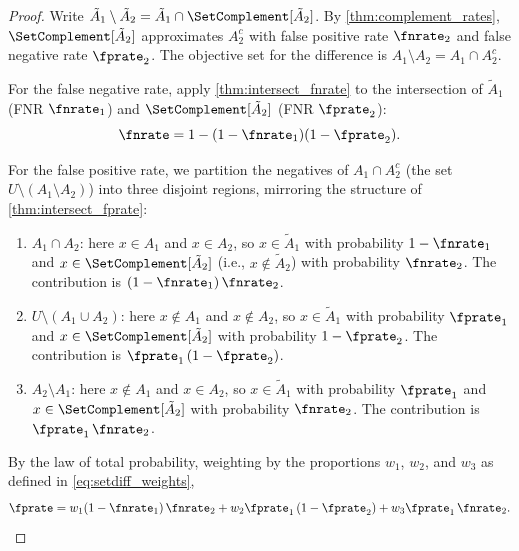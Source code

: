 \begin{proof}
Write $\tilde{A}_1 \setminus \tilde{A}_2
= \tilde{A}_1 \cap \SetComplement[\tilde{A}_2]$.
By \cref{thm:complement_rates}, $\SetComplement[\tilde{A}_2]$ approximates
$A_2^c$ with false positive rate $\fnrate_2$ and false negative rate
$\fprate_2$.
The objective set for the difference is
$A_1 \setminus A_2 = A_1 \cap A_2^c$.

For the false negative rate, apply \cref{thm:intersect_fnrate} to the
intersection of $\tilde{A}_1$ (FNR $\fnrate_1$) and
$\SetComplement[\tilde{A}_2]$ (FNR $\fprate_2$):
\begin{equation}
\fnrate = 1 - (1 - \fnrate_1)(1 - \fprate_2).
\end{equation}

For the false positive rate, we partition the negatives of
$A_1 \cap A_2^c$ (the set $U \setminus (A_1 \setminus A_2)$) into three
disjoint regions, mirroring the structure of \cref{thm:intersect_fprate}:
\begin{enumerate}[label=(\roman*)]
    \item $A_1 \cap A_2$: here $x \in A_1$ and $x \in A_2$, so
        $x \in \tilde{A}_1$ with probability $1 - \fnrate_1$ and
        $x \in \SetComplement[\tilde{A}_2]$ (i.e., $x \notin \tilde{A}_2$)
        with probability $\fnrate_2$.
        The contribution is $(1 - \fnrate_1)\,\fnrate_2$.

    \item $U \setminus (A_1 \cup A_2)$: here $x \notin A_1$ and
        $x \notin A_2$, so
        $x \in \tilde{A}_1$ with probability $\fprate_1$ and
        $x \in \SetComplement[\tilde{A}_2]$ with probability
        $1 - \fprate_2$.
        The contribution is $\fprate_1\,(1 - \fprate_2)$.

    \item $A_2 \setminus A_1$: here $x \notin A_1$ and $x \in A_2$, so
        $x \in \tilde{A}_1$ with probability $\fprate_1$ and
        $x \in \SetComplement[\tilde{A}_2]$ with probability $\fnrate_2$.
        The contribution is $\fprate_1\,\fnrate_2$.
\end{enumerate}

By the law of total probability, weighting by the proportions $w_1$,
$w_2$, and $w_3$ as defined in \cref{eq:setdiff_weights},
\begin{equation}
\fprate
= w_1 (1 - \fnrate_1)\, \fnrate_2
+ w_2 \fprate_1\, (1 - \fprate_2)
+ w_3 \fprate_1\, \fnrate_2. \qedhere
\end{equation}
\end{proof}

